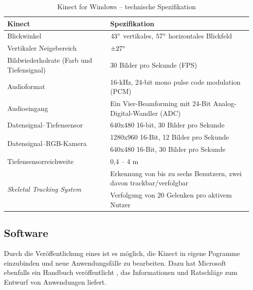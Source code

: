 \begin{table} [H] %
\begin{center}
\caption[Technische Spezifikation der Kinect for Windows]{Kinect for Windows -- technische Spezifikation \footnotemark[8]}
\label{tab:Kinect - technische Spezifikation}
\begin{tabular}{|p{5.7cm}|p{9cm}|}
\hline
\textbf{Kinect} & \textbf{Spezifikation} \\
\hline
Blickwinkel & $43\degree$ vertikales, $57\degree$ horizontales Blickfeld \\
\hline
Vertikaler Neigebereich & $\pm 27\degree$ \\
\hline
Bildwiederholrate (Farb und Tiefensignal) & 30 Bilder pro Sekunde (FPS) \\
\hline
Audioformat & 16-kHz, 24-bit mono pulse code modulation (PCM)\\
\hline
Audioeingang & Ein Vier-\gls{Beamforming} mit 24-Bit Analog-Digital-Wandler (ADC)\\
\hline
Datensignal--Tiefensensor & 640x480 16-bit, 30 Bilder pro Sekunde \\
\hline
\multirow{2}{*}{Datensignal--RGB-Kamera} & 1280x960 16-Bit, 12 Bilder pro Sekunde\\
& 640x480 16-Bit, 30 Bilder pro Sekunde \\
\hline
Tiefensensorreichweite & 0,4 -- 4 m\\
\hline
\multirow{2}{*}{
\textit{\gls{Skeletal Tracking System}}} & Erkennung von bis zu sechs Benutzern, zwei davon trackbar/verfolgbar\\
& Verfolgung von 20 Gelenken pro aktivem Nutzer\\
\hline
\end{tabular}
\end{center}
\end{table}


\subsection{Software}
Durch die Ver\"offentlichung eines  ist es m\"oglich, die Kinect in eigene Pogramme einzubinden und neue Anwendungsf\"alle zu bearbeiten.
Dazu hat Microsoft ebenfalls ein Handbuch ver\"offentlicht \cite{bib:kinect_hig}, das Informationen und Ratschl\"age zum Entwurf von Anwendungen liefert.
